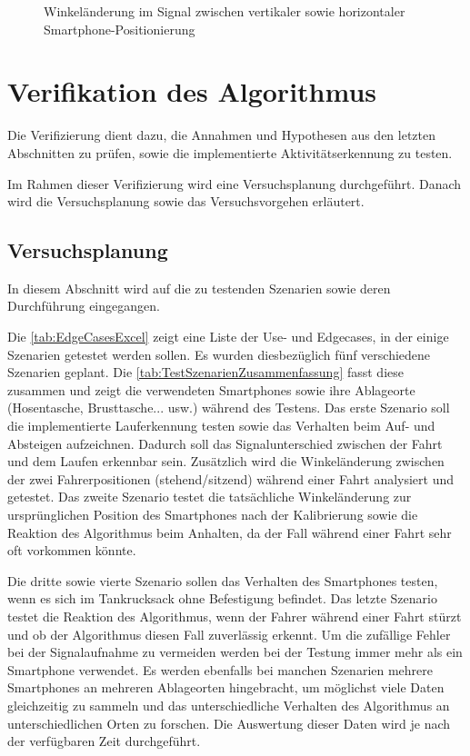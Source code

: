 \begin{figure}
	\centering
	\caption{Winkeländerung im Signal zwischen vertikaler sowie horizontaler Smartphone-Positionierung}
	\label{fig:SignalHorizontalUndVertikal}
\end{figure}



\section{Verifikation des Algorithmus}
Die Verifizierung dient dazu, die Annahmen und Hypothesen aus den letzten Abschnitten zu prüfen, sowie die implementierte Aktivitätserkennung zu testen.


Im Rahmen dieser Verifizierung wird eine Versuchsplanung durchgeführt. Danach wird die Versuchsplanung sowie das Versuchsvorgehen erläutert.
%
%
%
\subsection{Versuchsplanung} \label{ab:Versuchsplanung}

In diesem Abschnitt wird auf die zu testenden Szenarien sowie deren Durchführung eingegangen.

Die \autoref{tab:EdgeCasesExcel} zeigt eine Liste der Use- und Edgecases, in der einige Szenarien getestet werden sollen. Es wurden diesbezüglich fünf verschiedene Szenarien geplant.
Die \autoref{tab:TestSzenarienZusammenfassung} fasst diese zusammen und zeigt die verwendeten Smartphones sowie ihre Ablageorte (Hosentasche, Brusttasche... usw.) während des Testens. Das erste Szenario soll die implementierte Lauferkennung testen sowie das Verhalten beim Auf- und Absteigen aufzeichnen. Dadurch soll das Signalunterschied zwischen der Fahrt und dem Laufen erkennbar sein.
Zusätzlich wird die Winkeländerung zwischen der zwei Fahrerpositionen (stehend/sitzend) während einer Fahrt analysiert und getestet.
Das zweite Szenario testet die tatsächliche Winkeländerung zur ursprünglichen Position des Smartphones nach der Kalibrierung sowie die Reaktion des Algorithmus beim Anhalten, da der Fall während einer Fahrt sehr oft vorkommen könnte.

Die dritte sowie vierte Szenario sollen das Verhalten des Smartphones testen, wenn es sich im Tankrucksack ohne Befestigung befindet.
Das letzte Szenario testet die Reaktion des Algorithmus, wenn der Fahrer während einer Fahrt stürzt und ob der Algorithmus diesen Fall zuverlässig erkennt.
Um die zufällige Fehler bei der Signalaufnahme zu vermeiden werden bei der Testung immer mehr als ein Smartphone verwendet.
Es werden ebenfalls bei manchen Szenarien mehrere Smartphones an mehreren Ablageorten hingebracht, um möglichst viele Daten gleichzeitig zu sammeln und das unterschiedliche Verhalten des Algorithmus an unterschiedlichen Orten zu forschen.
Die Auswertung dieser Daten wird je nach der verfügbaren Zeit durchgeführt.

